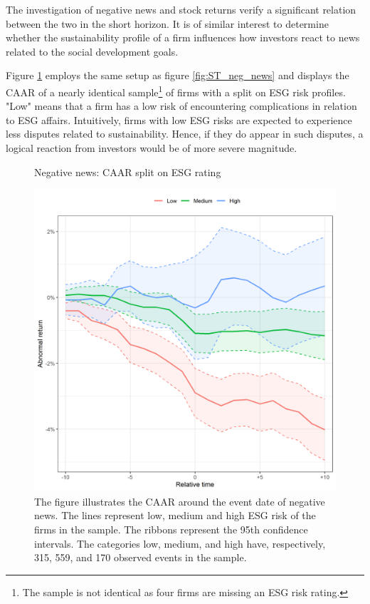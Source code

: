 The investigation of negative news and stock returns verify a significant relation between the two in the short horizon. It is of similar interest to determine whether the sustainability profile of a firm influences how investors react to news related to the social development goals. 

Figure \ref{fig:ST_neg_ESG} employs the same setup as figure \ref{fig:ST_neg_news} and displays the CAAR of a nearly identical sample\footnote{The sample is not identical as four firms are missing an ESG risk rating.} of firms with a split on ESG risk profiles. "Low" means that a firm has a low risk of encountering complications in relation to ESG affairs. Intuitively, firms with low ESG risks are expected to experience less disputes related to sustainability. Hence, if they do appear in such disputes, a logical reaction from investors would be of more severe magnitude. 

\begin{figure} [H]
    \centering
    \caption{Negative news: CAAR split on ESG rating}
    \includegraphics[scale=0.6]{Projekt/1.Figures analysis/ST_negative_ESG.png}
     \caption*{\footnotesize The figure illustrates the CAAR around the event date of negative news. The lines represent low, medium and high ESG risk of the firms in the sample. The ribbons represent the 95th confidence intervals. The categories low, medium, and high have, respectively, 315, 559, and 170 observed events in the sample. }
    \label{fig:ST_neg_ESG}
\end{figure} 


